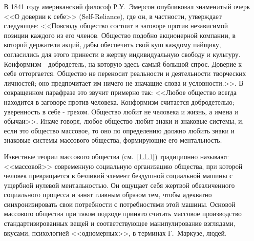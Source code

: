 В 1841 году американский философ Р.У.~Эмерсон опубликовал знаменитый очерк <<О доверии к себе>> (Self-Reliance),
где он, в частности, утверждает следующее: <<Повсюду общество состоит в заговоре против независимой позиции каждого из его членов. Общество подобно акционерной компании, в которой держатели акций, дабы  обеспечить свой куш каждому пайщику, согласились для этого принести в жертву  индивидуальную свободу и культуру. Конформизм  - добродетель, на которую здесь самый большой спрос.  Доверие к себе отторгается. Общество не переносит реальности и деятельности творческих личностей; оно предпочитает им ничего не значащие слова и условности.>>\autocite[][21]{emerson1972self}. В сокращенном парафразе это звучит примерно
так: <<Любое общество всегда находится в заговоре против человека. Конформизм считается добродетелью;
уверенность в себе - грехом. Общество любит не человека и жизнь, а имена и обычаи>>. Иначе говоря,
любое общество любит знаки и знаковые системы, и, если это общество массовое, то оно по определению
должно любить знаки и знаковые системы массового общества, формирующие его ментальность.

Известные теории массового общества (см.~\ref{1.1.1}) традиционно называют <<массовой>>
современную социальную организацию общества, при которой человек превращается в безликий
элемент бездушной социальной машины с ущербной нулевой
ментальностью\autocites{macdonald2011}[][3-30]{leavis1930}[][79-202]{eliot2010}. Он
ощущает себя жертвой обезличенного социального процесса и занят главным образом тем, чтобы адекватно
синхронизировать свои потребности с потребностями этой машины. Основой массового общества при таком
подходе принято считать массовое производство стандартизированных вещей и соответствующее
манипулирование взглядами, вкусами, психологией <<одномерных>>, в терминах Г.~Маркузе, людей.

